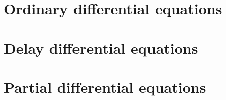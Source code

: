 \documentclass[12pt]{report}
\theoremstyle{plain}
\begin{document}
\part{Ordinary differential equations}





\part{Delay differential equations}



\part{Partial differential equations}


\appendix




\end{document}
